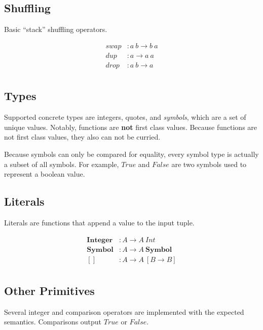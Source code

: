 \documentclass{article}
\begin{document}
\subsection{Shuffling}

Basic ``stack'' shuffling operators.

\begin{align*}
swap &: a\ b \to b\ a \\
dup &: a \to a\ a \\
drop &: a\ b \to a \\
\end{align*}

\subsection{Types}

Supported concrete types are integers, quotes, and \textit{symbols}, which are a set of unique values. Notably, functions are \textbf{not} first class values. Because functions are not first class values, they also can not be curried.

Because symbols can only be compared for equality, every symbol type is actually a subset of all symbols. For example, $True$ and $False$ are two symbols used to represent a boolean value.

\subsection{Literals}

Literals are functions that append a value to the input tuple.

\begin{align*}
  \mathbf{Integer} &: A \to A\ Int \\
  \mathbf{Symbol} &: A \to A\ \mathbf{Symbol} \\
  [] &: A \to A\ [B \to B] \\
\end{align*}

\subsection{Other Primitives}

Several integer and comparison operators are implemented with the expected semantics. Comparisons output $True$ or $False$.
\end{document}
